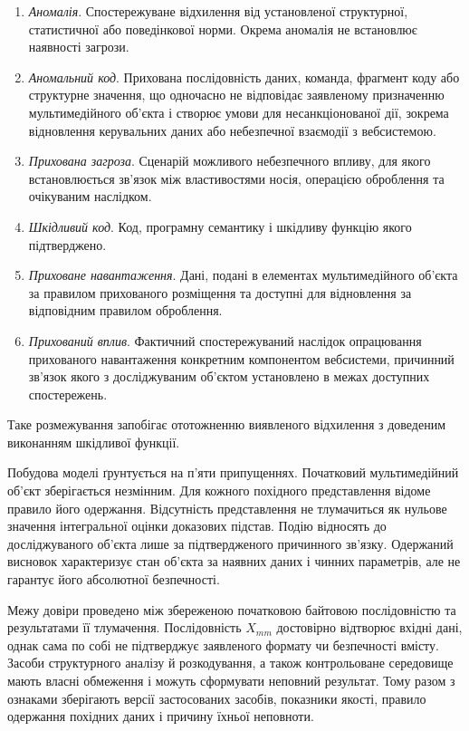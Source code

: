 \begin{enumerate}[label=\arabic*),leftmargin=1.1cm,itemsep=0pt,parsep=0pt]
\item \textit{Аномалія}. Спостережуване відхилення від установленої структурної, статистичної або поведінкової норми. Окрема аномалія не встановлює наявності загрози.
\item \textit{Аномальний код}. Прихована послідовність даних, команда, фрагмент коду або структурне значення, що одночасно не відповідає заявленому призначенню мультимедійного об’єкта і створює умови для несанкціонованої дії, зокрема відновлення керувальних даних або небезпечної взаємодії з вебсистемою.
\item \textit{Прихована загроза}. Сценарій можливого небезпечного впливу, для якого встановлюється зв’язок між властивостями носія, операцією оброблення та очікуваним наслідком.
\item \textit{Шкідливий код}. Код, програмну семантику і шкідливу функцію якого підтверджено.
\item \textit{Приховане навантаження}. Дані, подані в елементах мультимедійного об’єкта за правилом прихованого розміщення та доступні для відновлення за відповідним правилом оброблення.
\item \begin{minipage}[t]{\linewidth}
\textit{Прихований вплив}. Фактичний спостережуваний наслідок опрацювання прихованого навантаження конкретним компонентом вебсистеми, причинний зв’язок якого з досліджуваним об’єктом установлено в межах доступних спостережень.
\end{minipage}
\end{enumerate}

Таке розмежування запобігає ототожненню виявленого відхилення з доведеним виконанням шкідливої функції.

Побудова моделі ґрунтується на п’яти припущеннях. Початковий мультимедійний об’єкт зберігається незмінним. Для кожного похідного представлення відоме правило його одержання. Відсутність представлення не тлумачиться як нульове значення інтегральної оцінки доказових підстав. Подію відносять до досліджуваного об’єкта лише за підтвердженого причинного зв’язку. Одержаний висновок характеризує стан об’єкта за наявних даних і чинних параметрів, але не гарантує його абсолютної безпечності.

Межу довіри проведено між збереженою початковою байтовою послідовністю та результатами її тлумачення. Послідовність $X_{mm}$ достовірно відтворює вхідні дані, однак сама по собі не підтверджує заявленого формату чи безпечності вмісту. Засоби структурного аналізу й розкодування, а також контрольоване середовище мають власні обмеження і можуть сформувати неповний результат. Тому разом з ознаками зберігають версії застосованих засобів, показники якості, правило одержання похідних даних і причину їхньої неповноти.


